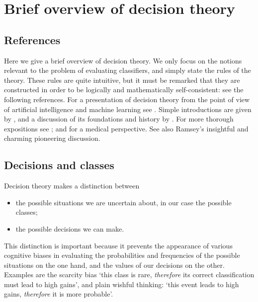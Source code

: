 \documentclass[\ifafour a4paper,12pt,\else a5paper,10pt,\fi%
onecolumn,oneside,article,%
british%
]{memoir}
\theoremstyle{remark}
\theoremstyle{innote}
\newcommand*{\wrench}{{\fontencoding{U}\fontfamily{fontawesomethree}\selectfont\symbol{114}}}
\newcommand{\mynotew}[1]{{\footnotesize\color{notecolour}\wrench\ #1}}
\renewcommand*{\|}[1][]{\nonscript\:#1\vert\nonscript\:\mathopen{}}
\newcommand*{\sect}{\S}%
\newcommand*{\chap}{ch.}%
\begin{document}




\section{Brief overview of decision theory}
\label{sec:decision_theory}

\subsection{References}
\label{sec:dt_refs}

Here we give a brief overview of decision theory. We only focus on the notions relevant to the problem of evaluating classifiers, and simply state the rules of the theory. These rules are quite intuitive, but it must be remarked that they are constructed in order to be logically and mathematically self-consistent: see the following references. For a presentation of decision theory from the point of view of artificial intelligence and machine learning see \cite[\chap~15]{russelletal1995_r2022}. Simple introductions are given by \cite{jeffrey1965,north1968,raiffa1968_r1970}, and a discussion of its foundations and history by \cite{steeleetal2015_r2020}. For more thorough expositions see \cite{raiffaetal1961_r2000,berger1980_r1985,savage1954_r1972}; and \cite{soxetal1988_r2013,huninketal2001_r2014} for a medical perspective. See also Ramsey's \cite*{ramsey1926} insightful and charming pioneering discussion.

\subsection{Decisions and classes}
\label{sec:dt_dec_classes}

Decision theory makes a distinction between
\begin{itemize}
\item the possible situations we are uncertain about, in our case the possible classes;
\item the possible decisions we can make.
\end{itemize}
This distinction is important because it prevents the appearance of various cognitive biases \autocites{kahnemanetal1982_r2008,gilovichetal2002_r2009,kahneman2011} in evaluating the probabilities and frequencies of the possible situations on the one hand, and the values of our decisions on the other. Examples are the scarcity bias\autocites{camereretal1989,kimetal1999,mittoneetal2009} \enquote*{this class is rare, \emph{therefore} its correct classification must lead to high gains}, and plain wishful thinking: \enquote*{this event leads to high gains, \emph{therefore} it is more probable}.
\end{document}
